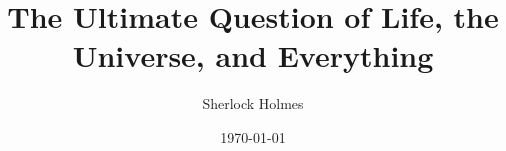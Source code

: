     \title{The Ultimate Question of Life, the Universe, and Everything}

    \author{Sherlock Holmes}

    \date{\today}

    \newcommand{\examinerA}{Prof. Dr. Yoda}
    \newcommand{\examinerB}{Prof. Dr. Kenobi}

    \newcommand{\thesisType}{Master}